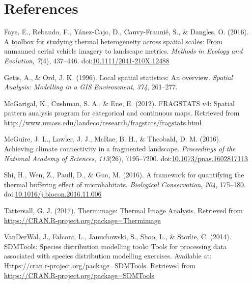 \documentclass[12pt,british,a4paper,]{article}
\begin{document}
\pagebreak

\hypertarget{references}{%
\section*{References}\label{references}}

\hypertarget{refs}{}
\leavevmode\hypertarget{ref-faye_toolbox_2016}{}%
Faye, E., Rebaudo, F., Yánez-Cajo, D., Cauvy-Fraunié, S., \& Dangles, O. (2016). A toolbox for studying thermal heterogeneity across spatial scales: From unmanned aerial vehicle imagery to landscape metrics. \emph{Methods in Ecology and Evolution}, \emph{7}(4), 437--446. doi:\href{https://doi.org/10.1111/2041-210X.12488}{10.1111/2041-210X.12488}

\leavevmode\hypertarget{ref-getis_local_1996}{}%
Getis, A., \& Ord, J. K. (1996). Local spatial statistics: An overview. \emph{Spatial Analysis: Modelling in a GIS Environment}, \emph{374}, 261--277.

\leavevmode\hypertarget{ref-fragstats_2012}{}%
McGarigal, K., Cushman, S. A., \& Ene, E. (2012). FRAGSTATS v4: Spatial pattern analysis program for categorical and continuous maps. Retrieved from \url{http://www.umass.edu/landeco/research/fragstats/fragstats.html}

\leavevmode\hypertarget{ref-mcguire_achieving_2016}{}%
McGuire, J. L., Lawler, J. J., McRae, B. H., \& Theobald, D. M. (2016). Achieving climate connectivity in a fragmented landscape. \emph{Proceedings of the National Academy of Sciences}, \emph{113}(26), 7195--7200. doi:\href{https://doi.org/10.1073/pnas.1602817113}{10.1073/pnas.1602817113}

\leavevmode\hypertarget{ref-shi_framework_2016}{}%
Shi, H., Wen, Z., Paull, D., \& Guo, M. (2016). A framework for quantifying the thermal buffering effect of microhabitats. \emph{Biological Conservation}, \emph{204}, 175--180. doi:\href{https://doi.org/10.1016/j.biocon.2016.11.006}{10.1016/j.biocon.2016.11.006}

\leavevmode\hypertarget{ref-tattersall_thermimage:_2017}{}%
Tattersall, G. J. (2017). Thermimage: Thermal Image Analysis. Retrieved from \url{https://CRAN.R-project.org/package=Thermimage}

\leavevmode\hypertarget{ref-sdmtools_2014}{}%
VanDerWal, J., Falconi, L., Januchowski, S., Shoo, L., \& Storlie, C. (2014). SDMTools: Species distribution modelling tools: Tools for processing data associated with species distribution modelling exercises. Available at: \href{https://CRAN.R-project.org/package=SDMTools}{Https://cran.r-project.org/package=SDMTools}. Retrieved from \url{https://CRAN.R-project.org/package=SDMTools}
\end{document}
